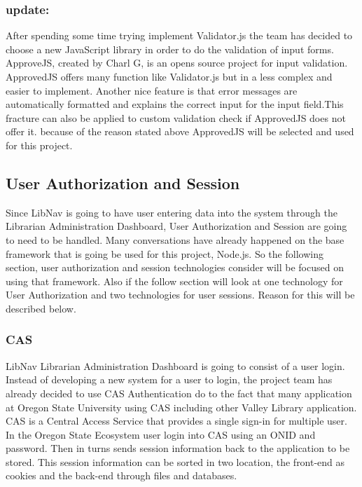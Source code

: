 \documentclass[letterpaper,10pt,titlepage, onecolumn, compsoc]{IEEEtran}
\begin{document}
\subsubsection{update:} After spending some time trying implement Validator.js the team has decided to choose a new JavaScript library in order to do the validation of input forms. ApproveJS, created by Charl G, is an opens source project for input validation. ApprovedJS offers many function like Validator.js but in a less complex and easier to implement. Another nice feature is that error messages are automatically formatted and explains the correct input for the input field.This fracture can also be applied to custom validation check if ApprovedJS does not offer it. because of the reason stated above ApprovedJS will be selected and used for this project.\cite{ApproveJS}

\subsection{User Authorization and Session}
Since LibNav is going to have user entering data into the system through the Librarian Administration Dashboard, User Authorization and Session are going to need to be handled. Many conversations have already happened on the base framework that is going be used for this project, Node.js. So the following section, user authorization and session technologies consider will be focused on using that framework. Also if the follow section will look at one technology for User Authorization and two technologies for user sessions. Reason for this will be described below.

\subsubsection{CAS}
LibNav Librarian Administration Dashboard is going to consist of a user login. Instead of developing a new system for a user to login, the project team has already decided to use CAS Authentication do to the fact that many application at Oregon State University using CAS including other Valley Library application.  CAS is a Central Access Service that provides a single sign-in for multiple user. In the Oregon State Ecosystem user login into CAS using an ONID and password. Then in turns sends session information back to the application to be stored. This session information can be sorted in two location, the front-end as cookies and the back-end through files and databases. 
\end{document}
